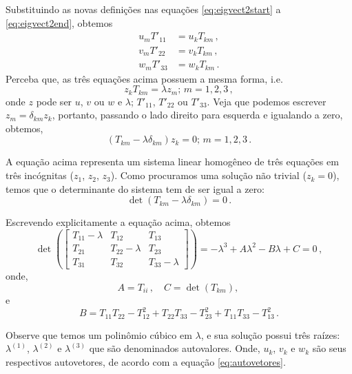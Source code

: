 Substituindo as novas defini\c{c}\~oes nas equa\c{c}\~oes 
\ref{eq:eigvect2start} a \ref{eq:eigvect2end},
obtemos
\begin{align}
  u_{m}T'_{11}  &=  u_{k}T_{km}\, , \\
  v_{m}T'_{22}  &=  v_{k}T_{km} \, ,\\
  w_{m}T'_{33}  &=  w_{k}T_{km} \,.
\end{align}
Perceba que, as tr\^es equa\c{c}\~oes acima possuem a mesma forma, i.e.
\begin{equation}
  z_{k}T_{km} = \lambda z_{m};\, m=1,2,3 \, ,
  \label{eq:autovetores}
\end{equation}
onde $z$ pode ser $u$, $v$ ou $w$ e $\lambda$; $T'_{11}$, $T'_{22}$ ou $T'_{33}$.
Veja que podemos escrever $z_m=\delta_{km}z_k$, portanto, passando o lado direito para
esquerda e igualando a zero, obtemos,
\begin{equation}
  (T_{km}-\lambda\delta_{km})z_k=0;\, m=1,2,3\, .
\end{equation}

A equa\c{c}\~ao acima representa um sistema linear homog\^eneo de tr\^es
equa\c{c}\~oes em tr\^es inc\'ognitas ($z_{1}$, $z_{2}$, $z_{3}$). Como
procuramos uma solu\c{c}\~ao n\~ao trivial ($z_{k}=0$), temos que o determinante
do sistema tem de ser igual a zero:
\begin{equation}
  \det(T_{km}-\lambda\delta_{km}) = 0 \, .
\end{equation}

Escrevendo explicitamente a equa\c{c}\~ao acima, obtemos
\begin{equation}
  \det\left(
  \begin{bmatrix}
    T_{11}-\lambda & T_{12} & T_{13} \\
    T_{21} & T_{22}-\lambda & T_{23} \\
    T_{31} & T_{32} & T_{33} -\lambda
  \end{bmatrix}\right)
  = -\lambda^3 + A\lambda^2-B\lambda+C = 0
  \, ,
\end{equation}
onde,
\begin{equation}
  A =T_{ii}\, , \quad C=\det(T_{km}), \,
\end{equation}
e
\begin{equation}
  B = T_{11}T_{22} - T^2_{12} + T_{22}T_{33} -T^2_{23} + T_{11}T_{33} -
  T^2_{13}\, .
\end{equation}

Observe que temos um polin\^omio c\'ubico em $\lambda$, e sua solu\c{c}\~ao
possui tr\^es ra\'izes: $\lambda^{(1)}$, $\lambda^{(2)}$ e $\lambda^{(3)}$ que
s\~ao denominados autovalores. Onde, $u_k$, $v_k$ e $w_k$ s\~ao seus respectivos
autovetores, de acordo com a equa\c{c}\~ao \ref{eq:autovetores}.

